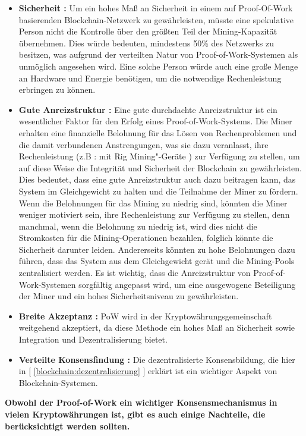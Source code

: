 \begin{itemize}
	\item \textbf{Sicherheit :} Um ein hohes Maß an Sicherheit in einem auf Proof-Of-Work basierenden Blockchain-Netzwerk zu gewährleisten, müsste eine spekulative Person nicht die Kontrolle über den größten Teil der Mining-Kapazität übernehmen. Dies würde bedeuten, mindestens 50\% des Netzwerks zu besitzen, was aufgrund der verteilten Natur von Proof-of-Work-Systemen als unmöglich angesehen wird. Eine solche Person würde auch eine große Menge an Hardware und Energie benötigen, um die notwendige Rechenleistung erbringen zu können.
	
	
	\item \textbf{Gute Anreizstruktur :} Eine gute durchdachte Anreizstruktur ist ein wesentlicher Faktor für den Erfolg eines Proof-of-Work-Systems. Die Miner erhalten eine finanzielle Belohnung für das Lösen von Rechenproblemen und die damit verbundenen Anstrengungen, was sie dazu veranlasst, ihre Rechenleistung (z.B : mit Rig Mining"-Geräte ) zur Verfügung zu stellen, um auf diese Weise die Integrität und Sicherheit der Blockchain zu gewährleisten. Dies bedeutet, dass eine gute Anreizstruktur auch dazu beitragen kann, das System im Gleichgewicht zu halten und die Teilnahme der Miner zu fördern. Wenn die Belohnungen für das Mining zu niedrig sind, könnten die Miner weniger motiviert sein, ihre Rechenleistung zur Verfügung zu stellen, denn manchmal, wenn die Belohnung zu niedrig ist, wird dies nicht die Stromkosten für die Mining-Operationen bezahlen, folglich könnte die Sicherheit darunter leiden. Andererseits könnten zu hohe Belohnungen dazu führen, dass das System aus dem Gleichgewicht gerät und die Mining-Pools zentralisiert werden. Es ist wichtig, dass die Anreizstruktur von Proof-of-Work-Systemen sorgfältig angepasst wird, um eine ausgewogene Beteiligung der Miner und ein hohes Sicherheitsniveau zu gewährleisten.
	
	
	\item \textbf{Breite Akzeptanz :} PoW wird in der Kryptowährungsgemeinschaft weitgehend akzeptiert, da diese Methode ein hohes Maß an Sicherheit sowie Integration und Dezentralisierung bietet.
	
	\item \textbf{Verteilte Konsensfindung :} Die dezentralisierte Konsensbildung, die hier in [ \cref{blockchain:dezentralisierung} ] erklärt ist ein wichtiger Aspekt von Blockchain-Systemen. \\
\end{itemize}
\textbf{Obwohl der Proof-of-Work ein wichtiger Konsensmechanismus in vielen Kryptowährungen ist, gibt es auch einige Nachteile, die berücksichtigt werden sollten.}

